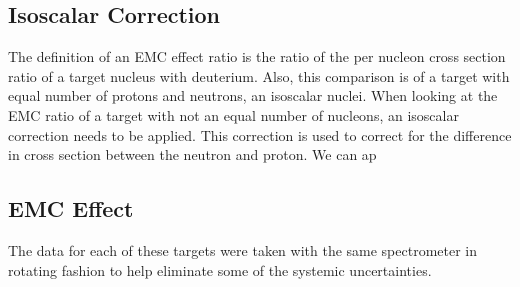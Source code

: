 
\subsection{Isoscalar Correction}
	The definition of an EMC effect ratio is the ratio of the per nucleon cross section ratio of a target nucleus with deuterium. Also,  this comparison is of a target with equal number of protons and neutrons, an isoscalar nuclei. When looking at the EMC ratio of a target with not an equal number of nucleons, an isoscalar correction needs to be applied. This correction is used to correct for the difference in cross section between the neutron and proton. We can ap


\subsection{EMC Effect}

The data for each of these targets were taken with the same spectrometer in rotating fashion to help eliminate some of the systemic uncertainties.


